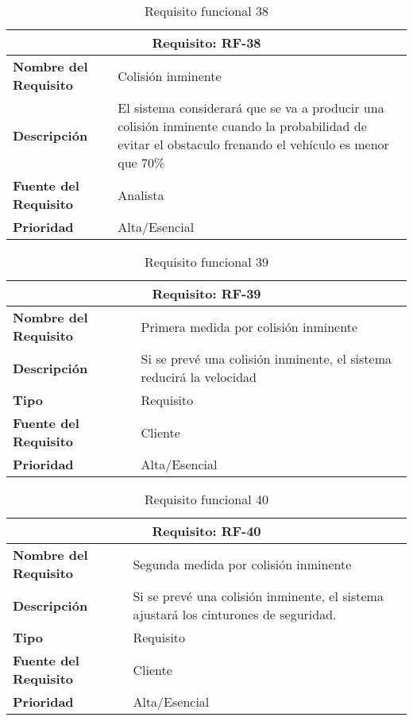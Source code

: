 \begin{table}[H]
\begin{center}
\begin{tabular}{p{} p{7cm}}
\multicolumn{2}{c}{\textbf{Requisito: RF-38} } \\
\hline \hline
\textbf{Nombre del Requisito} & Colisión inminente\\
\hline
\textbf{Descripción} &  El sistema considerará que se va a producir una colisión inminente cuando la probabilidad de evitar el obstaculo frenando el vehículo es menor que 70\%  \\
\hline
\textbf{Fuente del Requisito} & Analista \\
\hline
\textbf{Prioridad} & Alta/Esencial \\ \hline
\end{tabular}
\caption{Requisito funcional 38}
\label{tab:RF-38}
\end{center}
\end{table}

\begin{table}[H]
\begin{center}
\begin{tabular}{p{} p{7cm}}
\multicolumn{2}{c}{\textbf{Requisito: RF-39} } \\
\hline \hline
\textbf{Nombre del Requisito} & Primera medida por colisión inminente\\
\hline
\textbf{Descripción} &  Si se prevé una colisión inminente, el sistema reducirá la velocidad\\
\hline
\textbf{Tipo} & Requisito  \\
\hline
\textbf{Fuente del Requisito} & Cliente  \\
\hline
\textbf{Prioridad} & Alta/Esencial \\ \hline
\end{tabular}
\caption{Requisito funcional 39}
\label{tab:RF-39}
\end{center}
\end{table}

\begin{table}[H]
\begin{center}
\begin{tabular}{p{} p{7cm}}
\multicolumn{2}{c}{\textbf{Requisito: RF-40} } \\
\hline \hline
\textbf{Nombre del Requisito} & Segunda medida por colisión inminente\\
\hline
\textbf{Descripción} &  Si se prevé una colisión inminente, el sistema ajustará los cinturones de seguridad.\\
\hline
\textbf{Tipo} & Requisito  \\
\hline
\textbf{Fuente del Requisito} & Cliente  \\
\hline
\textbf{Prioridad} & Alta/Esencial \\ \hline
\end{tabular}
\caption{Requisito funcional 40}
\label{tab:RF-40}
\end{center}
\end{table}

